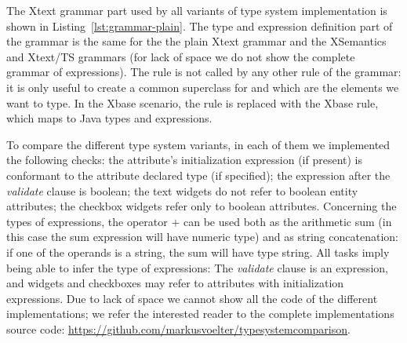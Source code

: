 The Xtext grammar part used by all variants of type system implementation is
shown in Listing~\ref{lst:grammar-plain}. The type and expression definition
part of the grammar is the same
for the the plain Xtext grammar and the XSemantics and Xtext/TS grammars (for lack of space we
do not show the complete grammar of expressions).
The rule  is not called by any other rule of the grammar: it is
only useful to create a common superclass for  and
 which are the elements we want to type.
In the Xbase scenario, the rule  is replaced with the Xbase
 rule, which maps to Java types and expressions.


%




To compare the different type system variants, in each of them we implemented
the following checks: the attribute's initialization expression (if present)
is conformant to the attribute declared type (if specified); the expression
after the \emph{validate} clause is boolean; the text widgets do not refer to
boolean entity attributes; the checkbox widgets refer only to boolean
attributes.
Concerning the types of expressions, the operator $+$ can be used both as the
arithmetic sum (in this case the sum expression will have numeric type) and as
string concatenation: if one of the operands is a string, the sum will have type
string.  All tasks imply being able to infer the type of expressions:
The \emph{validate} clause is an expression, and widgets and checkboxes may refer to attributes with
initialization expressions.  Due to lack of space we cannot show all the code of
the different implementations; we refer the interested reader to the complete
implementations source code:
\url{https://github.com/markusvoelter/typesystemcomparison}.
